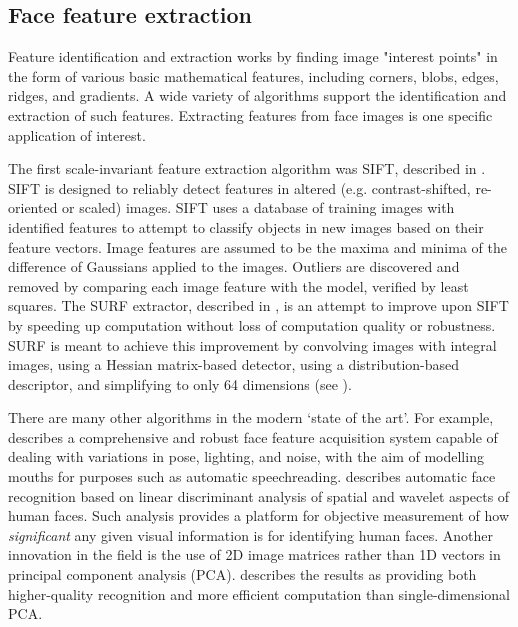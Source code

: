 \subsection{Face feature extraction}
\label{sec:features-prior}

Feature identification and extraction works by finding image "interest points" in the form of various basic mathematical features, including corners, blobs, edges, ridges, and gradients. A wide variety of algorithms support the identification and extraction of such features. Extracting features from face images is one specific application of interest.

The first scale-invariant feature extraction algorithm was SIFT, described in \cite{SIFT}. SIFT is designed to reliably detect features in altered (e.g. contrast-shifted, re-oriented or scaled) images. SIFT uses a database of training images with identified features to attempt to classify objects in new images based on their feature vectors. Image features are assumed to be the maxima and minima of the difference of Gaussians applied to the images. Outliers are discovered and removed by comparing each image feature with the model, verified by least squares. The SURF extractor, described in \cite{SURF}, is an attempt to improve upon SIFT by speeding up computation without loss of computation quality or robustness. SURF is meant to achieve this improvement by convolving images with integral images, using a Hessian matrix-based detector, using a distribution-based descriptor, and simplifying to only 64 dimensions (see \cite{SURF}).

There are many other algorithms in the modern `state of the art'. For example, \cite{speechreading} describes a comprehensive and robust face feature acquisition system capable of dealing with variations in pose, lighting, and noise, with the aim of modelling mouths for purposes such as automatic speechreading. \cite{discriminantanalysis} describes automatic face recognition based on linear discriminant analysis of spatial and wavelet aspects of human faces. Such analysis provides a platform for objective measurement of how \emph{significant} any given visual information is for identifying human faces. Another innovation in the field is the use of 2D image matrices rather than 1D vectors in principal component analysis (PCA). \cite{2d-pca} describes the results as providing both higher-quality recognition and more efficient computation than single-dimensional PCA.
